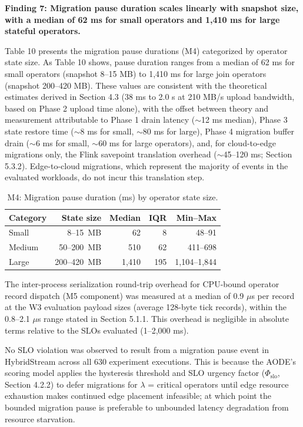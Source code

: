 \documentclass[preprint,review,12pt]{elsarticle}
\begin{document}
\textbf{Finding 7: Migration pause duration scales linearly with snapshot size, with a median of 62 ms for small operators and 1,410 ms for large stateful operators.}

Table 10 presents the migration pause durations (M4) categorized by operator state size. As Table 10 shows, pause duration ranges from a median of 62 ms for small operators (snapshot 8--15 MB) to 1,410 ms for large join operators (snapshot 200--420 MB). These values are consistent with the theoretical estimates derived in Section 4.3 (38 ms to 2.0 s at 210 MB/s upload bandwidth, based on Phase 2 upload time alone), with the offset between theory and measurement attributable to Phase 1 drain latency ($\sim$12 ms median), Phase 3 state restore time ($\sim$8 ms for small, $\sim$80 ms for large), Phase 4 migration buffer drain ($\sim$6 ms for small, $\sim$60 ms for large operators), and, for cloud-to-edge migrations only, the Flink savepoint translation overhead ($\sim$45--120 ms; Section 5.3.2). Edge-to-cloud migrations, which represent the majority of events in the evaluated workloads, do not incur this translation step.


\begin{table}[htbp]
\centering
\caption{M4: Migration pause duration (ms) by operator state size.}
\label{tab:migration}
\begin{tabular}{@{}lrrrr@{}}
\toprule
Category & State size & Median & IQR & Min--Max \\
\midrule
Small & 8--15~MB & 62 & 8 & 48--91 \\
Medium & 50--200~MB & 510 & 62 & 411--698 \\
Large & 200--420~MB & 1,410 & 195 & 1,104--1,844 \\
\bottomrule
\end{tabular}
\end{table}


The inter-process serialization round-trip overhead for CPU-bound operator record dispatch (M5 component) was measured at a median of 0.9 $\mu$s per record at the W3 evaluation payload sizes (average 128-byte tick records), within the 0.8--2.1 $\mu$s range stated in Section 5.1.1. This overhead is negligible in absolute terms relative to the SLOs evaluated (1--2,000 ms).

No SLO violation was observed to result from a migration pause event in HybridStream across all 630 experiment executions. This is because the AODE's scoring model applies the hysteresis threshold and SLO urgency factor ($\Phi_{\text{slo}}$, Section 4.2.2) to defer migrations for $\lambda$ = critical operators until edge resource exhaustion makes continued edge placement infeasible; at which point the bounded migration pause is preferable to unbounded latency degradation from resource starvation.
\end{document}
